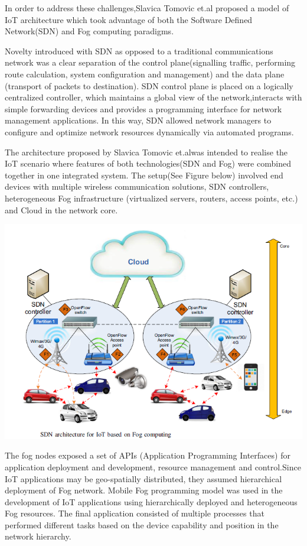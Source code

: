 \documentclass{article}
\begin{document}
In order to address these challenges,Slavica Tomovic et.al\cite{tomovic2017software} proposed a model of IoT architecture which took advantage of both the Software Defined Network(SDN) and Fog computing paradigms.
 
Novelty introduced with SDN as opposed to a traditional communications network was a clear separation of the control plane(signalling traffic, performing route
calculation, system configuration and management) and the data plane (transport of packets to destination)\cite{tomovic2017software}. 
SDN control plane is placed on a logically centralized controller, which maintains a global view of the network,interacts with simple forwarding devices and provides a programming interface for network management applications. In this way, SDN allowed network managers to configure and optimize network resources dynamically via automated programs\cite{tomovic2017software}.
 
The architecture proposed by Slavica Tomovic et.al\cite{tomovic2017software}was intended to realise the IoT scenario where features of both technologies(SDN and Fog) were combined together in one integrated system.
The setup(See Figure below)\cite{tomovic2017software} involved end devices with multiple wireless communication solutions, SDN controllers, heterogeneous Fog infrastructure (virtualized servers, routers, access points, etc.) and Cloud in the network core\cite{tomovic2017software}.


\includegraphics[scale=0.7]{sdn.png}

The fog nodes exposed a set of APIs (Application Programming Interfaces) for application deployment and development, resource management and control.Since IoT applications may be geo-spatially distributed, they assumed hierarchical deployment of Fog network. 
Mobile Fog programming model\cite{hong2013mobile} was used in the development of IoT applications using hierarchically deployed and heterogeneous Fog resources.
The final application consisted of multiple processes that performed different tasks based on the device capability and position in the network hierarchy.
\end{document}
